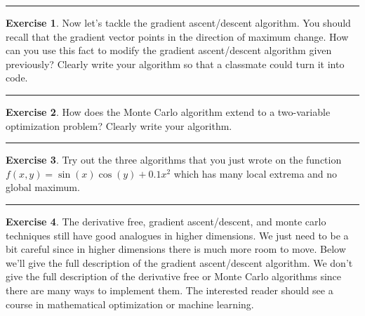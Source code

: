 \documentclass[
]{book}
\theoremstyle{definition}
\theoremstyle{definition}
\theoremstyle{definition}
\newtheorem{exercise}{Exercise}[chapter]
\theoremstyle{remark}
\begin{document}
\begin{center}\rule{0.5\linewidth}{0.5pt}\end{center}

\begin{exercise}
\protect\hypertarget{exr:unnamed-chunk-204}{}{\label{exr:unnamed-chunk-204} }Now let's tackle the gradient ascent/descent algorithm. You should
recall that the gradient vector points in the direction of maximum
change. How can you use this fact to modify the gradient ascent/descent
algorithm given previously? Clearly write your algorithm so that a
classmate could turn it into code.
\end{exercise}

\begin{center}\rule{0.5\linewidth}{0.5pt}\end{center}

\begin{exercise}
\protect\hypertarget{exr:unnamed-chunk-205}{}{\label{exr:unnamed-chunk-205} }How does the Monte Carlo algorithm extend to a two-variable optimization
problem? Clearly write your algorithm.
\end{exercise}

\begin{center}\rule{0.5\linewidth}{0.5pt}\end{center}

\begin{exercise}
\protect\hypertarget{exr:unnamed-chunk-206}{}{\label{exr:unnamed-chunk-206} }Try out the three algorithms that you just wrote on the function
\(f(x,y) =  \sin(x)\cos(y) + 0.1 x^2\) which has many local extrema and no global
maximum.
\end{exercise}

\begin{center}\rule{0.5\linewidth}{0.5pt}\end{center}

\begin{exercise}
\protect\hypertarget{exr:unnamed-chunk-207}{}{\label{exr:unnamed-chunk-207} }The derivative free, gradient ascent/descent, and monte carlo techniques
still have good analogues in higher dimensions. We just need to be a bit
careful since in higher dimensions there is much more room to move.
Below we'll give the full description of the gradient ascent/descent
algorithm. We don't give the full description of the derivative free or
Monte Carlo algorithms since there are many ways to implement them. The
interested reader should see a course in mathematical optimization or
machine learning.
\end{exercise}
\end{document}
